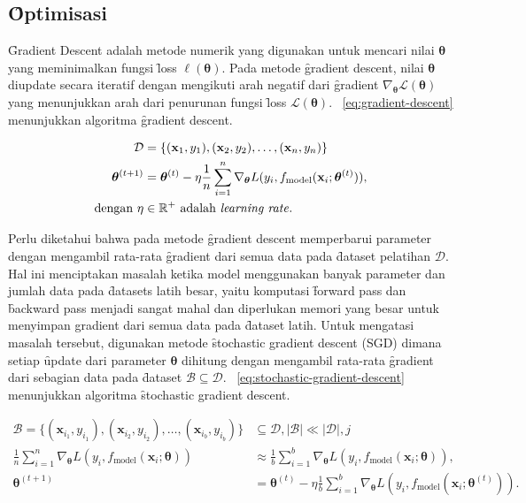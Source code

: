     \subsection{\f{Optimisasi}}

    \f{Gradient Descent} adalah metode numerik yang digunakan untuk mencari nilai $\bm{\theta}$ yang meminimalkan fungsi \f{loss} $\ell(\bm{\theta})$. Pada metode \f{gradient descent}, nilai $\bm{\theta}$ diupdate secara iteratif dengan mengikuti arah negatif dari \f{gradient} $\nabla_{\bm{\theta}} \mathcal{L}(\bm{\theta})$ yang menunjukkan arah dari penurunan fungsi \f{loss} $\mathcal{L}(\bm{\theta})$. \equ~\ref{eq:gradient-descent} menunjukkan algoritma \f{gradient descent}.

    \begin{align}
        \mathcal{D} &= \{(\mathbf{x}_1, y_1), (\mathbf{x}_2, y_2), \dots, (\mathbf{x}_n, y_n)\} \\
        \label{eq:gradient-descent}
        \bm{\theta}^{(t+1)} &= \bm{\theta}^{(t)} - \eta \frac{1}{n} \sum_{i=1}^{n} \nabla_{\bm{\theta}} L(y_i, f_{\text{model}}(\mathbf{x}_i; \bm{\theta}^{(t)})), \\
        \text{dengan } \eta &\in \mathbb{R}^+ \text{ adalah \textit{learning rate}}.
    \end{align}

    Perlu diketahui bahwa pada metode \f{gradient descent} memperbarui parameter dengan mengambil rata-rata \f{gradient} dari semua data pada \f{dataset} pelatihan $\mathcal{D}$. Hal ini menciptakan masalah ketika model menggunakan banyak parameter dan jumlah data pada \f{datasets} latih besar, yaitu komputasi \f{forward pass} dan \f{backward pass} menjadi sangat mahal dan diperlukan memori yang besar untuk menyimpan gradient dari semua data pada \f{dataset} latih. Untuk mengatasi masalah tersebut, digunakan metode \f{stochastic gradient descent} (SGD) dimana setiap \f{update} dari parameter $\bm{\theta}$ dihitung dengan mengambil rata-rata \f{gradient} dari sebagian data pada \f{dataset} $\mathcal{B}\subseteq\mathcal{D}$. \equ~\ref{eq:stochastic-gradient-descent} menunjukkan algoritma \f{stochastic gradient descent}.

    \begin{align}
        \mathcal{B} = \{(\mathbf{x}_{i_1}, y_{i_1}), (\mathbf{x}_{i_2}, y_{i_2}), \dots, (\mathbf{x}_{i_b}, y_{i_b})\} &\subseteq \mathcal{D}, \mid \mathcal{B} \mid \ll \mid \mathcal{D} \mid,j \\
        \label{eq:stochastic-gradient-descent-approx}
        \frac{1}{n} \sum_{i=1}^{n} \nabla_{\bm{\theta}} L(y_i, f_{\text{model}}(\mathbf{x}_i; \bm{\theta})) &\approx \frac{1}{b} \sum_{i=1}^{b} \nabla_{\bm{\theta}} L(y_{i}, f_{\text{model}}(\mathbf{x}_{i}; \bm{\theta})), \\
        \label{eq:stochastic-gradient-descent}
        \bm{\theta}^{(t+1)} &= \bm{\theta}^{(t)} - \eta \frac{1}{b} \sum_{i=1}^{b} \nabla_{\bm{\theta}} L(y_{i}, f_{\text{model}}(\mathbf{x}_{i}; \bm{\theta}^{(t)})).
    \end{align}

